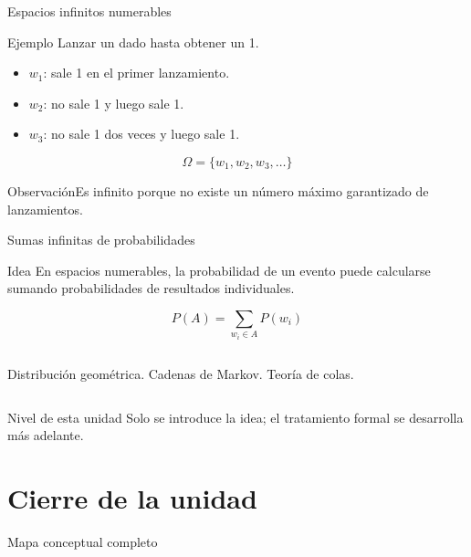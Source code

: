 \documentclass[aspectratio=169,11pt]{beamer}
\newcommand{\observacion}[1]{\begin{block}{Observación}#1\end{block}}
\begin{document}
\begin{frame}{Espacios infinitos numerables}
\begin{block}{Ejemplo}
Lanzar un dado hasta obtener un 1.
\end{block}
\begin{itemize}
  \item $w_1$: sale 1 en el primer lanzamiento.
  \item $w_2$: no sale 1 y luego sale 1.
  \item $w_3$: no sale 1 dos veces y luego sale 1.
\end{itemize}
\[
\Omega=\{w_1,w_2,w_3,\ldots\}
\]
\observacion{Es infinito porque no existe un número máximo garantizado de lanzamientos.}
\end{frame}

\begin{frame}{Sumas infinitas de probabilidades}
\begin{block}{Idea}
En espacios numerables, la probabilidad de un evento puede calcularse sumando probabilidades de resultados individuales.
\end{block}
\[
P(A)=\sum_{w_i\in A}P(w_i)
\]
\begin{columns}[T]
Distribución geométrica.
Cadenas de Markov.
Teoría de colas.
\end{columns}
\begin{alertblock}{Nivel de esta unidad}
Solo se introduce la idea; el tratamiento formal se desarrolla más adelante.
\end{alertblock}
\end{frame}

\section{Cierre de la unidad}

\begin{frame}{Mapa conceptual completo}
\centering
{}
\end{frame}
\end{document}
